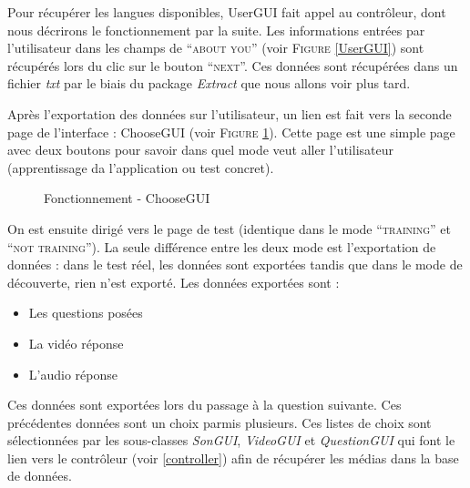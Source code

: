 Pour récupérer les langues disponibles, UserGUI fait appel au contrôleur, dont nous décrirons le fonctionnement par la suite.
Les informations entrées par l'utilisateur dans les champs de ``\textsc{about you}'' (voir \textsc{Figure} \ref{UserGUI}) sont récupérés lors du clic sur le bouton ``\textsc{next}''. Ces données sont récupérées dans un fichier \textit{txt} par le biais du package \textit{Extract} que nous allons voir plus tard.

Après l'exportation des données sur l'utilisateur, un lien est fait vers la seconde page de l'interface : ChooseGUI (voir \textsc{Figure} \ref{ChooseGUI}). Cette page est une simple page avec deux boutons pour savoir dans quel mode veut aller l'utilisateur (apprentissage da l'application ou test concret).

\newpage

\begin{figure}[!ht]
\begin{center}
  \caption{Fonctionnement - ChooseGUI}
  \label{ChooseGUI} 
\end{center}
\end{figure}

On est ensuite dirigé vers le page de test (identique dans le mode ``\textsc{training}'' et ``\textsc{not training}''). La seule différence entre les deux mode est l'exportation de données : dans le test réel, les données sont exportées tandis que dans le mode de découverte, rien n'est exporté.
Les données exportées sont :
\begin{itemize}
 \item Les questions posées
 \item La vidéo réponse
 \item L'audio réponse
\end{itemize}
Ces données sont exportées lors du passage à la question suivante.
Ces précédentes données sont un choix parmis plusieurs. Ces listes de choix sont sélectionnées par les sous-classes \textit{SonGUI}, \textit{VideoGUI} et \textit{QuestionGUI} qui font le lien vers le contrôleur (voir \ref{controller}) afin de récupérer les médias dans la base de données.

